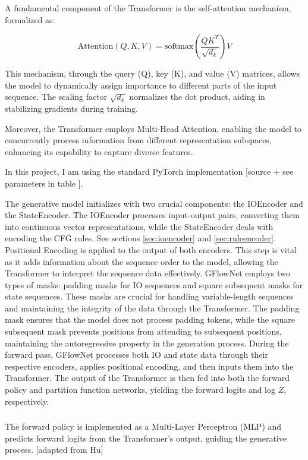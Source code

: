 A fundamental component of the Transformer is the self-attention mechanism, formalized as:

\begin{equation}
    \text{Attention}(Q, K, V) = \text{softmax}(\frac{QK^T}{\sqrt{d_k}})V
\end{equation}

This mechanism, through the query (Q), key (K), and value (V) matrices, allows the model to dynamically assign importance to different parts of the input sequence. The scaling factor $\sqrt{d_k}$ normalizes the dot product, aiding in stabilizing gradients during training.

Moreover, the Transformer employs Multi-Head Attention, enabling the model to concurrently process information from different representation subspaces, enhancing its capability to capture diverse features. 

In this project, I am using the standard PyTorch implementation [source + see parameters in table ].

The generative model initializes with two crucial components: the IOEncoder and the StateEncoder. The IOEncoder processes input-output pairs, converting them into continuous vector representations, while the StateEncoder deals with encoding the CFG rules. See sections \ref{sec:ioencoder} and \ref{sec:ruleencoder}.
Positional Encoding is applied to the output of both encoders. This step is vital as it adds information about the sequence order to the model, allowing the Transformer to interpret the sequence data effectively.
GFlowNet employs two types of masks: padding masks for IO sequences and square subsequent masks for state sequences. These masks are crucial for handling variable-length sequences and maintaining the integrity of the data through the Transformer. The padding mask ensures that the model does not process padding tokens, while the square subsequent mask prevents positions from attending to subsequent positions, maintaining the autoregressive property in the generation process.
During the forward pass, GFlowNet processes both IO and state data through their respective encoders, applies positional encoding, and then inputs them into the Transformer. The output of the Transformer is then fed into both the forward policy and partition function networks, yielding the forward logits and log $Z$, respectively.


\subsubsection{}
The forward policy is implemented as a Multi-Layer Perceptron (MLP) and predicts forward logits from the Transformer's output, guiding the generative process.
[adapted from Hu]
